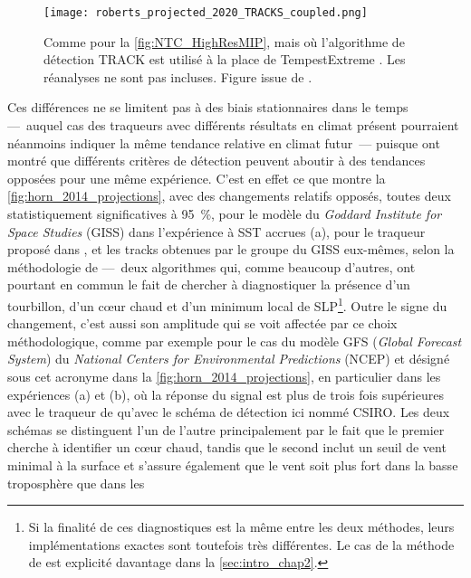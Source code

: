 \documentclass[../main.tex]{subfiles}
\begin{document}
\begin{figure}[htbp]
    \centering
    \texttt{[image: roberts\_projected\_2020\_TRACKS\_coupled.png]}
    \caption{Comme pour la \cref{fig:NTC_HighResMIP}, mais où l'algorithme de détection TRACK \parencite{hodges_how_2017} est utilisé à la place de
    TempestExtreme \parencite{ullrich_tempestextremes_2017,zarzycki_assessing_2017}. Les réanalyses ne sont pas incluses. Figure issue de
    \textcite{roberts_projected_2020}.}
    \label{fig:NTC_HighResMIP_TRACK}
\end{figure}

Ces différences ne se limitent pas à des biais stationnaires dans le temps ---~auquel cas des traqueurs avec différents résultats en climat présent pourraient
néanmoins indiquer la même tendance relative en climat futur~--- puisque \textcite{horn_tracking_2014} ont montré que différents critères de détection peuvent
aboutir à des tendances opposées pour une même expérience. C'est en effet ce que montre la \cref{fig:horn_2014_projections}, avec des changements relatifs
opposés, toutes deux statistiquement significatives à \SI{95}{\percent}, pour le modèle du \textit{Goddard Institute for Space Studies} (GISS) dans l'expérience
à SST accrues (a), pour le traqueur proposé dans \textcite{zhao_simulations_2009}, et les tracks obtenues par le groupe du GISS eux-mêmes, selon la méthodologie de
\textcite{camargo_improving_2002} ---~deux algorithmes qui, comme beaucoup d'autres, ont pourtant en commun le fait de chercher à diagnostiquer la présence d'un
tourbillon, d'un cœur chaud et d'un minimum local de SLP\footnote{Si la finalité de ces diagnostiques est la même entre les deux méthodes, leurs implémentations
exactes sont toutefois très différentes. Le cas de la méthode de \textcite{camargo_improving_2002} est explicité davantage dans la \cref{sec:intro_chap2}.}. Outre
le signe du changement, c'est aussi son amplitude qui se voit affectée par ce choix méthodologique, comme par exemple pour le cas du modèle GFS (\textit{Global
Forecast System}) du \textit{National Centers for Environmental Predictions} (NCEP) et désigné sous cet acronyme dans la \cref{fig:horn_2014_projections}, en
particulier dans les expériences (a) et (b), où la réponse du signal est plus de trois fois supérieures avec le traqueur de \textcite{zhao_simulations_2009} qu'avec
le schéma de détection ici nommé CSIRO. Les deux schémas se distinguent l'un de l'autre principalement par le fait que le premier cherche à identifier un cœur
chaud, tandis que le second inclut un seuil de vent minimal à la surface et s'assure également que le vent soit plus fort dans la basse troposphère que dans les
\end{document}
